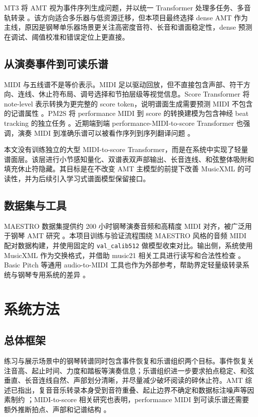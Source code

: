 \documentclass[UTF8,a4paper,zihao=-4]{ctexart}
\newcommand{\code}[1]{\texttt{#1}}
\begin{document}
MT3 将 AMT 视为事件序列生成问题，并以统一 Transformer 处理多任务、多音轨转录 \cite{gardner2022mt3}。该方向适合多乐器与低资源迁移，但本项目最终选择 dense AMT 作为主线，原因是钢琴单乐器场景更关注高密度音符、长音和谱面稳定性，dense 预测在调试、阈值校准和错误定位上更直接。

\subsection{从演奏事件到可读乐谱}

MIDI 与五线谱不是等价表示。MIDI 足以驱动回放，但不直接包含声部、符干方向、连线、休止符布局、调号选择和节拍层级等视觉信息。Score Transformer 将 note-level 表示转换为更完整的 score token，说明谱面生成需要预测 MIDI 不包含的记谱属性 \cite{suzuki2021scoretransformer}。PM2S 将 performance MIDI 到 score 的转换建模为包含神经 beat tracking 的独立任务 \cite{liu2022pm2s}。近期端到端 performance-MIDI-to-score Transformer 也强调，演奏 MIDI 到准确乐谱可以被看作序列到序列翻译问题 \cite{beyer2024midi2score}。

本文没有训练独立的大型 MIDI-to-score Transformer，而是在系统中实现了轻量谱面层。该层进行小节感知量化、双谱表双声部输出、长音连线、和弦整体吸附和填充休止符隐藏。其目标是在不改变 AMT 主模型的前提下改善 MusicXML 的可读性，并为后续引入学习式谱面模型保留接口。

\subsection{数据集与工具}

MAESTRO 数据集提供约 200 小时钢琴演奏音频和高精度 MIDI 对齐，被广泛用于钢琴 AMT 研究 \cite{hawthorne2019maestro}。本项目训练与验证流程围绕 MAESTRO 风格的音频 MIDI 配对数据构建，并使用固定的 \code{val\_calib512} 做模型收束对比。输出侧，系统使用 MusicXML 作为交换格式，并借助 music21 相关工具进行读写和合法性检查 \cite{cuthbert2010music21}。Basic Pitch 等通用 audio-to-MIDI 工具也作为外部参考，帮助界定轻量级转录系统与钢琴专用系统的差异 \cite{basicpitch2022}。

\section{系统方法}

\subsection{总体框架}

练习与展示场景中的钢琴转谱同时包含事件恢复和乐谱组织两个目标。事件恢复关注音高、起止时间、力度和踏板等演奏信息；乐谱组织进一步要求拍点稳定、和弦垂直、长音连线自然、声部划分清晰，并尽量减少破坏阅读的碎休止符。AMT 综述已指出，复音音乐转录本身受到音符重叠、起止边界不确定和数据标注噪声等因素制约 \cite{benetos2019overview}；MIDI-to-score 相关研究也表明，performance MIDI 到可读乐谱还需要额外推断拍点、声部和记谱结构 \cite{liu2022pm2s,suzuki2021scoretransformer,beyer2024midi2score}。
\end{document}
